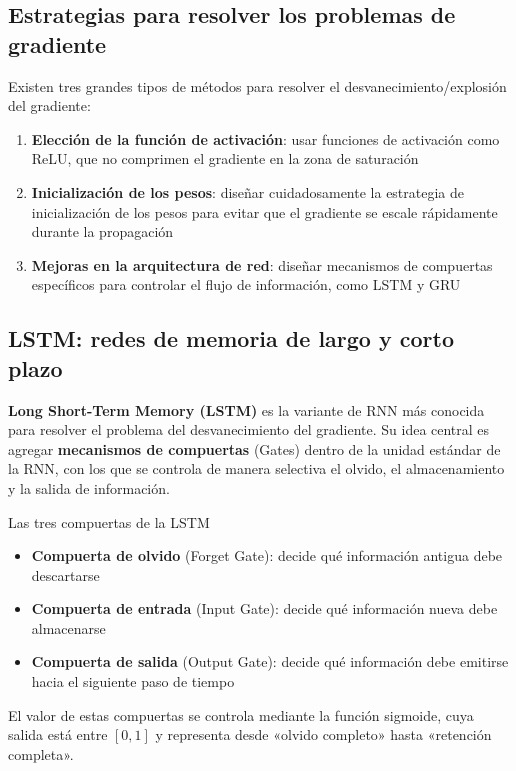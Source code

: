 \documentclass[a4paper]{article}
\begin{document}
\subsection{Estrategias para resolver los problemas de gradiente}

Existen tres grandes tipos de métodos para resolver el desvanecimiento/explosión del gradiente:

\begin{enumerate}
    \item \textbf{Elección de la función de activación}: usar funciones de activación como ReLU, que no comprimen el gradiente en la zona de saturación
    \item \textbf{Inicialización de los pesos}: diseñar cuidadosamente la estrategia de inicialización de los pesos para evitar que el gradiente se escale rápidamente durante la propagación
    \item \textbf{Mejoras en la arquitectura de red}: diseñar mecanismos de compuertas específicos para controlar el flujo de información, como LSTM y GRU
\end{enumerate}

\subsection{LSTM: redes de memoria de largo y corto plazo}

\textbf{Long Short-Term Memory (LSTM)} es la variante de RNN más conocida para resolver el problema del desvanecimiento del gradiente. Su idea central es agregar \textbf{mecanismos de compuertas} (Gates) dentro de la unidad estándar de la RNN, con los que se controla de manera selectiva el olvido, el almacenamiento y la salida de información.

\begin{importantbox}{Las tres compuertas de la LSTM}
\begin{itemize}
    \item \textbf{Compuerta de olvido} (Forget Gate): decide qué información antigua debe descartarse
    \item \textbf{Compuerta de entrada} (Input Gate): decide qué información nueva debe almacenarse
    \item \textbf{Compuerta de salida} (Output Gate): decide qué información debe emitirse hacia el siguiente paso de tiempo
\end{itemize}
El valor de estas compuertas se controla mediante la función sigmoide, cuya salida está entre $[0, 1]$ y representa desde «olvido completo» hasta «retención completa».
\end{importantbox}
\end{document}

